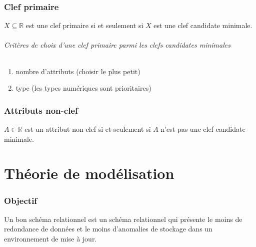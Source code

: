 \documentclass[10pt]{article}
\begin{document}
    \section{Clef primaire}
        $X\subseteq \mathbb{R}$ est une clef primaire si et seulement si $X$ est une clef candidate minimale.

        \paragraph{Critères de choix d'une clef primaire parmi les clefs candidates minimales}
            \begin{enumerate}
                \item nombre d'attributs (choisir le plus petit)
                \item type (les types numériques sont prioritaires)
            \end{enumerate}

    \section{Attributs non-clef}
        $A\in \mathbb{R}$ est un attribut non-clef si et seulement si $A$ n'est pas une clef candidate minimale.

\newpage
\part{Théorie de modélisation}
    \section{Objectif}
        Un bon schéma relationnel est un schéma relationnel qui présente le moins de redondance de données et le moins d'anomalies de stockage dans un environnement de mise à jour.
\end{document}
